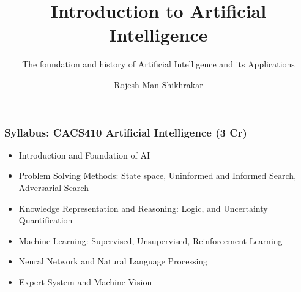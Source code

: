\documentclass{beamer}
\title{Introduction to Artificial Intelligence}
\subtitle{The foundation and history of Artificial Intelligence and its Applications}
\author[RMS]{Rojesh Man Shikhrakar}
\begin{document}
\maketitle

\begin{frame}
  \frametitle{Syllabus: CACS410 Artificial Intelligence (3 Cr)}
  \begin{itemize}
    \item Introduction and Foundation of AI
    \item Problem Solving Methods: State space, Uninformed and Informed Search, Adversarial Search
    \item Knowledge Representation and Reasoning: Logic, and Uncertainty Quantification
    \item Machine Learning: Supervised, Unsupervised, Reinforcement Learning
    \item Neural Network and Natural Language Processing
    \item Expert System and Machine Vision
  \end{itemize}
\end{frame}
\end{document}
